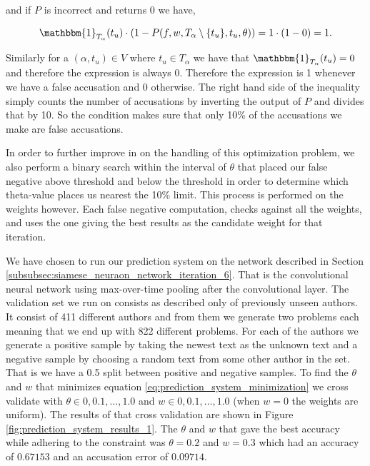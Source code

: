 and if $P$ is incorrect and returns 0 we have,

\begin{equation}
    \mathbbm{1}_{T_\alpha}(t_u) \cdot
    \left(1 - P(f, w, T_\alpha \setminus \{t_u\}, t_u, \theta)\right) =
    1 \cdot (1 - 0) = 1.
\end{equation}

Similarly for a $(\alpha, t_u) \in V$ where $t_u \in T_\alpha$ we have that
$\mathbbm{1}_{T_\alpha}(t_u) = 0$ and therefore the expression is always
0. Therefore the expression is 1 whenever we have a false accusation and 0
otherwise. The right hand side of the inequality simply counts the number of
accusations by inverting the output of $P$ and divides that by 10. So the
condition makes sure that only 10\% of the accusations we make are false
accusations.

In order to further improve in on the handling of this optimization problem, 
we also perform a binary search within the interval of $\theta$ that placed
our false negative above threshold and below the threshold in order
to determine which theta-value places us nearest the 10\% limit. 
This process is performed on the weights however. Each false negative
computation, checks against all the weights, and uses the one giving the
best results as the candidate weight for that iteration.

We have chosen to run our prediction system on the network described in Section
\ref{subsubsec:siamese_neuraon_network_iteration_6}. That is the convolutional
neural network using max-over-time pooling after the convolutional layer.
The validation set we run on consists as described only of previously unseen
authors. It consist of 411 different authors and from them we generate two
problems each meaning that we end up with 822 different problems. For each
of the authors we generate a positive sample by taking the newest text as
the unknown text and a negative sample by choosing a random text from some
other author in the set. That is we have a 0.5 split between positive and
negative samples. To find the $\theta$ and $w$ that minimizes equation
\ref{eq:prediction_system_minimization} we cross validate with $\theta \in
0, 0.1, \dots, 1.0$ and $w \in 0, 0.1, \dots, 1.0$ (when $w = 0$ the weights
are uniform). The results of that cross validation are shown in Figure
\ref{fig:prediction_system_results_1}. The $\theta$ and $w$ that gave the best
accuracy while adhering to the constraint was $\theta = 0.2$ and $w = 0.3$ which
had an accuracy of $0.67153$ and an accusation error of $0.09714$.

